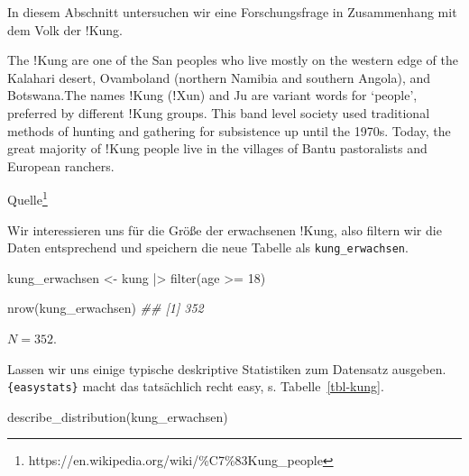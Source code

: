\documentclass[
  ngerman,
  letterpaper,
  twoside,
  open=any]{scrbook}
\newenvironment{Shaded}{\begin{snugshade}}{\end{snugshade}}
\newcommand{\DecValTok}[1]{\textcolor[rgb]{0.68,0.00,0.00}{#1}}
\newcommand{\DocumentationTok}[1]{\textcolor[rgb]{0.37,0.37,0.37}{\textit{#1}}}
\newcommand{\FunctionTok}[1]{\textcolor[rgb]{0.28,0.35,0.67}{#1}}
\newcommand{\NormalTok}[1]{\textcolor[rgb]{0.00,0.23,0.31}{#1}}
\newcommand{\OtherTok}[1]{\textcolor[rgb]{0.00,0.23,0.31}{#1}}
\newcommand{\SpecialCharTok}[1]{\textcolor[rgb]{0.37,0.37,0.37}{#1}}
\theoremstyle{definition}
\theoremstyle{plain}
\theoremstyle{definition}
\theoremstyle{definition}
\theoremstyle{definition}
\theoremstyle{definition}
\theoremstyle{remark}
\begin{document}
In diesem Abschnitt untersuchen wir eine Forschungsfrage in Zusammenhang
mit dem Volk der !Kung.

\begin{displayquote}
The ǃKung are one of the San peoples who live mostly on the western edge
of the Kalahari desert, Ovamboland (northern Namibia and southern
Angola), and Botswana.The names ǃKung (ǃXun) and Ju are variant words
for \enquote*{people}, preferred by different ǃKung groups. This band
level society used traditional methods of hunting and gathering for
subsistence up until the 1970s. Today, the great majority of ǃKung
people live in the villages of Bantu pastoralists and European ranchers.
\end{displayquote}

Quelle\footnote{https://en.wikipedia.org/wiki/\%C7\%83Kung\_people}

Wir interessieren uns für die Größe der erwachsenen !Kung, also filtern
wir die Daten entsprechend und speichern die neue Tabelle als
\texttt{kung\_erwachsen}.

\begin{Shaded}
\begin{Highlighting}[]
\NormalTok{kung\_erwachsen }\OtherTok{\textless{}{-}}\NormalTok{ kung }\SpecialCharTok{|\textgreater{}} 
  \FunctionTok{filter}\NormalTok{(age }\SpecialCharTok{\textgreater{}=} \DecValTok{18}\NormalTok{)}

\FunctionTok{nrow}\NormalTok{(kung\_erwachsen)}
\DocumentationTok{\#\# [1] 352}
\end{Highlighting}
\end{Shaded}

\(N=352\).

Lassen wir uns einige typische deskriptive Statistiken zum Datensatz
ausgeben. \texttt{\{easystats\}} macht das tatsächlich recht easy, s.
Tabelle~\ref{tbl-kung}.

\begin{Shaded}
\begin{Highlighting}[]
\FunctionTok{describe\_distribution}\NormalTok{(kung\_erwachsen)}
\end{Highlighting}
\end{Shaded}
\end{document}
